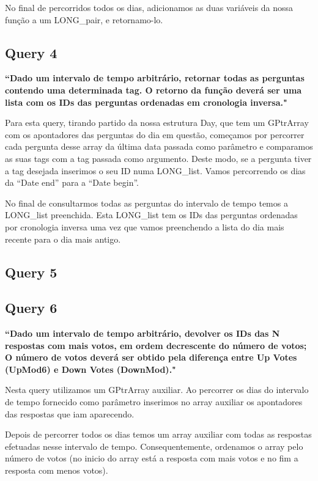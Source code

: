 \documentclass[a4paper]{report}
\begin{document}
No final de percorridos todos os dias, adicionamos as duas variáveis da nossa função a um LONG\_pair, e retornamo-lo.


\subsection*{Query 4}
\label{sec:query4}

\textbf{“Dado um intervalo de tempo arbitrário, retornar todas as perguntas contendo uma determinada tag.
O retorno da função deverá ser uma lista com os IDs das perguntas ordenadas em cronologia inversa."}

Para esta query, tirando partido da nossa estrutura Day, que tem um GPtrArray com
os apontadores das perguntas do dia em questão, começamos por percorrer cada pergunta desse array
da última data passada como parâmetro e comparamos as suas tags com a tag passada como argumento.
Deste modo, se a pergunta tiver a tag desejada inserimos o seu ID numa LONG\_list.
Vamos percorrendo os dias da “Date end” para a “Date begin”.

No final de consultarmos todas as perguntas do intervalo de tempo temos a LONG\_list preenchida.
Esta LONG\_list tem os IDs das perguntas ordenadas por cronologia inversa uma vez que
vamos preenchendo a lista do dia mais recente para o dia mais antigo.



\subsection*{Query 5}
\label{sec:query5}

\subsection*{Query 6}
\label{sec:query6}

\textbf{“Dado um intervalo de tempo arbitrário, devolver os IDs das N respostas
com mais votos, em ordem decrescente do número de votos; O número de votos deverá
ser obtido pela diferença entre Up Votes (UpMod6) e Down Votes (DownMod)."}

Nesta query utilizamos um GPtrArray auxiliar. Ao percorrer os dias do intervalo
de tempo fornecido como parâmetro inserimos no array auxiliar os apontadores das
respostas que iam aparecendo.

Depois de percorrer todos os dias temos um array auxiliar com todas as respostas
efetuadas nesse intervalo de tempo. Consequentemente, ordenamos o array pelo número
de votos (no inicio do array está a resposta com mais votos e no fim a resposta com menos votos).
\end{document}
